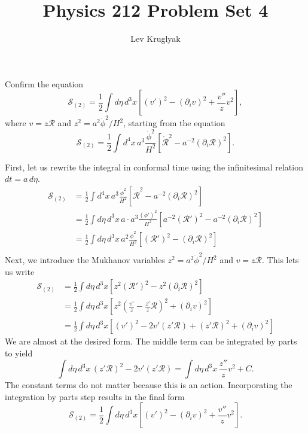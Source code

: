 \documentclass{lkx_pset}
\title{Physics 212 Problem Set 4}
\author{Lev Kruglyak}
\begin{document}
\maketitle

\begin{problem}{1}
  Confirm the equation
  \[
    \mathcal{S}_{(2)} = \frac{1}{2}\int d\eta\,d^3x\left[ (v')^2-(\partial_i v)^2 + \frac{v''}{z}v^2\right],
  \]
  where $v=z\mathcal{R}$ and $z^2=a^2\dot{\phi}^2/H^2$, starting from the equation
  \[
    \mathcal{S}_{(2)} = \frac{1}{2}\int d^4 x\, a^3\frac{\dot{\phi}^2}{H^2}\left[\dot{\mathcal{R}}^2 - a^{-2}(\partial_i \mathcal{R})^2\right].
  \]
\end{problem}
\begin{solution}
  First, let us rewrite the integral in conformal time using the infinitesimal relation $dt=a\,d\eta$.
  \[
    \begin{aligned}
    \mathcal{S}_{(2)} 
    &= \frac{1}{2}\int d^4 x\, a^3\frac{\dot{\phi}^2}{H^2}\left[\dot{\mathcal{R}}^2 - a^{-2}(\partial_i \mathcal{R})^2\right]\\
    &= \frac{1}{2}\int d\eta\,d^3x\, a\cdot a^3\frac{(\phi')^2}{H^2}\left[a^{-2}(\mathcal{R}')^2 - a^{-2}(\partial_i \mathcal{R})^2\right]\\
    &= \frac{1}{2}\int d\eta\,d^3x\, a^2\frac{\dot{\phi}^2}{H^2}\left[(\mathcal{R}')^2 - (\partial_i \mathcal{R})^2\right]\\
    \end{aligned}
  \]
  Next, we introduce the Mukhanov variables $z^2= a^2\dot{\phi}^2/H^2$ and $v=z\mathcal{R}$. This lets us write
  \[
    \begin{aligned}
    \mathcal{S}_{(2)} 
    &= \frac{1}{2}\int d\eta\,d^3x \left[z^2(\mathcal{R}')^2 - z^2(\partial_i\mathcal{R})^2\right]\\
    &= \frac{1}{2}\int d\eta\,d^3x \left[z^2\left(\frac{v'}{z}-\frac{z'}{z}\mathcal{R}\right)^2 + (\partial_i v)^2\right]\\
    &= \frac{1}{2}\int d\eta\,d^3x \left[(v')^2- 2v'(z'\mathcal{R}) + (z'\mathcal{R})^2 + (\partial_i v)^2\right]
    \end{aligned}
  \]
  We are almost at the desired form. The middle term can be integrated by parts to yield
  \[
    \int d\eta\,d^3x\, (z'\mathcal{R})^2- 2v'(z'\mathcal{R}) =\int d\eta\,d^3 x\, \frac{z''}{z}v^2 + C.
  \]
  The constant terms do not matter because this is an action. Incorporating the integration by parts step results in the final form
  \[
      \mathcal{S}_{(2)}=\frac{1}{2}\int d\eta\,d^3x\left[ (v')^2-(\partial_i v)^2 + \frac{v''}{z}v^2\right].
  \]
\end{solution}
\end{document}
